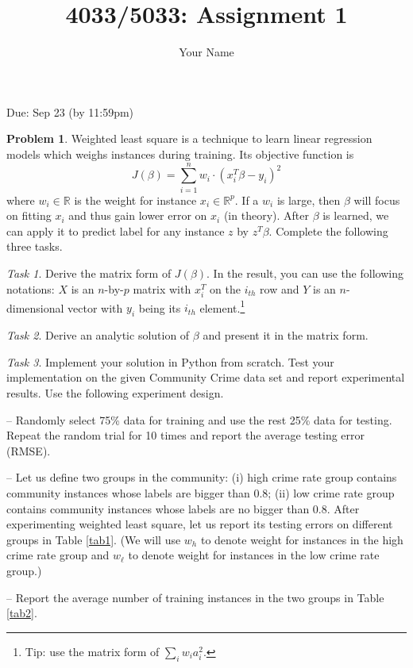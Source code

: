 \documentclass{llncs}
\title{4033/5033: Assignment 1}
\author{Your Name}
\institute{}
\begin{document}
\maketitle 

\setlength\parindent{0pt} 
\setlength{\parskip}{10pt}

Due: Sep 23 (by 11:59pm)

\textbf{Problem 1}. 
Weighted least square is a technique to learn 
linear regression models which weighs instances during training. Its objective function is 
\begin{equation}
J(\beta) = {\sum}_{i=1}^{n} w_{i} 
\cdot (x_{i}^{T}\beta - y_{i})^2
\end{equation}
where $w_{i} \in \mathbb{R}$ is the weight for instance 
$x_{i} \in \mathbb{R}^{p}$. If a $w_i$ is large, then 
$\beta$ will focus on fitting $x_i$ and thus gain 
lower error on $x_i$ (in theory).  
After $\beta$ is learned, we can apply it 
to predict label for any instance $z$ by 
$z^T \beta$. 
Complete the following three tasks. 

\textit{Task 1}. Derive the matrix form of $J(\beta)$. 
In the result, you can use the following notations: 
$X$ is an $n$-by-$p$ matrix with $x_i^T$ on the $i_{th}$ 
row and $Y$ is an $n$-dimensional vector with 
$y_i$ being its $i_{th}$ element.\footnote{Tip: 
use the matrix form of $\sum_i w_i a_i^2$.}  

\textit{Task 2}. Derive an analytic solution of 
$\beta$ and present it in the matrix form. 

\textit{Task 3}. Implement your solution in Python 
from scratch. Test your implementation on the given 
Community Crime data set and report experimental 
results. Use the following experiment design. 

-- Randomly select 75\% data for training and use 
the rest 25\% data for testing. Repeat the random 
trial for 10 times and report the average 
testing error (RMSE). 

-- Let us define two groups in the community: 
(i) high crime rate group contains community instances 
whose labels are bigger than 0.8; (ii) low crime rate 
group contains community instances whose labels are 
no bigger than 0.8. After experimenting weighted least 
square, let us report its testing 
errors on different groups 
in Table \ref{tab1}. 
(We will use $w_h$ to denote weight for instances in 
the high crime rate group and $w_\ell$ to denote 
weight for instances in the low crime rate group.)

-- Report the average number of 
training instances in the two groups in Table 
\ref{tab2}. 
\end{document}
